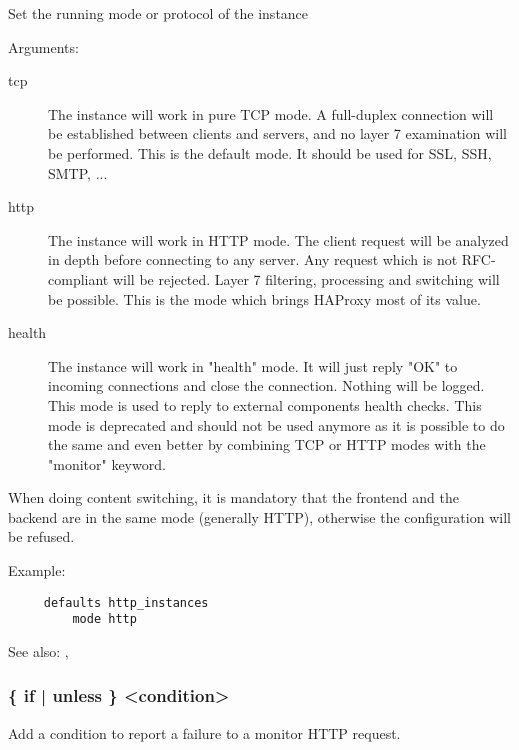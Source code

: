   Set the running mode or protocol of the instance


  Arguments:
\begin{description}
\item[tcp]
              The instance will work in pure TCP mode. A full-duplex connection
              will be established between clients and servers, and no layer 7
              examination will be performed. This is the default mode. It
              should be used for SSL, SSH, SMTP, ...

\item[http]
              The instance will work in HTTP mode. The client request will be
              analyzed in depth before connecting to any server. Any request
              which is not RFC-compliant will be rejected. Layer 7 filtering,
              processing and switching will be possible. This is the mode which
              brings HAProxy most of its value.

\item[health]
              The instance will work in "health" mode. It will just reply "OK"
              to incoming connections and close the connection. Nothing will be
              logged. This mode is used to reply to external components health
              checks. This mode is deprecated and should not be used anymore as
              it is possible to do the same and even better by combining TCP or
              HTTP modes with the "monitor" keyword.
\end{description}

  When doing content switching, it is mandatory that the frontend and the
  backend are in the same mode (generally HTTP), otherwise the configuration
  will be refused.

  Example:
\begin{verbatim}
     defaults http_instances
         mode http
\end{verbatim}

  See also: , 

\subsubsection[monitor fail]{ \{ if | unless \} <condition>}

  Add a condition to report a failure to a monitor HTTP request.



